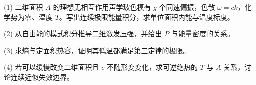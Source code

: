 (1) 二维面积 \(A\) 的理想无相互作用声学玻色模有 \(g\) 个同速偏振，色散 \(\omega=ck\)，化学势为零、温度 \(T\)。写出连续极限能量积分，求单位面积内能与温度标度。

(2) 从自由能的模式积分推导二维激发压强，并给出 \(P\) 与能量密度的关系。

(3) 求熵与定面积热容，证明其低温都满足第三定律的极限。

(4) 若可以缓慢改变二维面积且 \(c\) 不随形变变化，求可逆绝热的 \(T\) 与 \(A\) 关系，讨论连续近似失效边界。
